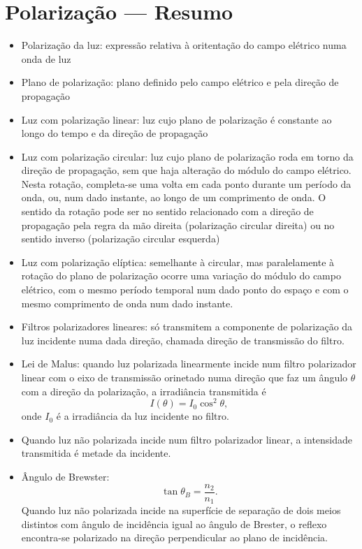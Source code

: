 \section*{Polarização --- Resumo}
\begin{itemize}[leftmargin=*]
\item
  Polarização da luz: expressão relativa à oritentação do campo elétrico numa
  onda de luz
\item
  Plano de polarização: plano definido pelo campo elétrico e pela direção de
  propagação
\item
  Luz com polarização linear: luz cujo plano de polarização é constante ao longo
  do tempo e da direção de propagação
\item
  Luz com polarização circular: luz cujo plano de polarização roda em torno da
  direção de propagação, sem que haja alteração do módulo do campo elétrico.
  Nesta rotação, completa-se uma volta em cada ponto durante um período da onda,
  ou, num dado instante, ao longo de um comprimento de onda. O sentido da
  rotação pode ser no sentido relacionado com a direção de propagação pela regra
  da mão direita (polarização circular direita) ou no sentido inverso
  (polarização circular esquerda)
\item
  Luz com polarização elíptica: semelhante à circular, mas paralelamente à
  rotação do plano de polarização ocorre uma variação do módulo do campo
  elétrico, com o mesmo período temporal num dado ponto do espaço e com o mesmo
  comprimento de onda num dado instante.
\item
  Filtros polarizadores lineares: só transmitem a componente de polarização da
  luz incidente numa dada direção, chamada direção de transmissão do filtro.
\item
  Lei de Malus: quando luz polarizada linearmente incide num filtro polarizador
  linear com o eixo de transmissão orinetado numa direção que faz um ângulo
  $\theta$ com a direção da polarização, a irradiância transmitida é
  \begin{equation*}
  I(\theta)=I_0\cos^2\theta,
  \end{equation*}
  onde $I_0$ é a irradiância da luz incidente no filtro.
\item
  Quando luz não polarizada incide num filtro polarizador linear, a intensidade
  transmitida é metade da incidente.
\item
  Ângulo de Brewster:
  \begin{equation*}
  \tan\theta_B=\frac{n_2}{n_1}.
  \end{equation*}
  Quando luz não polarizada incide na superfície de separação de dois meios
  distintos com ângulo de incidência igual ao ângulo de Brester, o reflexo
  encontra-se polarizado na direção perpendicular ao plano de incidência.
  
  
\end{itemize}
